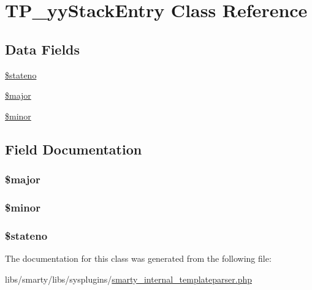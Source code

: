 \hypertarget{class_t_p__yy_stack_entry}{}\section{T\+P\+\_\+yy\+Stack\+Entry Class Reference}
\label{class_t_p__yy_stack_entry}
\subsection*{Data Fields}
\begin{DoxyCompactItemize}
\item 
\hyperlink{class_t_p__yy_stack_entry_aebe2d8de0440725d5783d4447a8548d4}{\$stateno}
\item 
\hyperlink{class_t_p__yy_stack_entry_af144df62b50cc25e0fdcc5bb80e30360}{\$major}
\item 
\hyperlink{class_t_p__yy_stack_entry_ada7edccfef7601184431347519c2ff53}{\$minor}
\end{DoxyCompactItemize}


\subsection{Field Documentation}
\hypertarget{class_t_p__yy_stack_entry_af144df62b50cc25e0fdcc5bb80e30360}{}
\subsubsection[{\$major}]{\setlength{\rightskip}{0pt plus 5cm}\$major}\label{class_t_p__yy_stack_entry_af144df62b50cc25e0fdcc5bb80e30360}
\hypertarget{class_t_p__yy_stack_entry_ada7edccfef7601184431347519c2ff53}{}
\subsubsection[{\$minor}]{\setlength{\rightskip}{0pt plus 5cm}\$minor}\label{class_t_p__yy_stack_entry_ada7edccfef7601184431347519c2ff53}
\hypertarget{class_t_p__yy_stack_entry_aebe2d8de0440725d5783d4447a8548d4}{}
\subsubsection[{\$stateno}]{\setlength{\rightskip}{0pt plus 5cm}\$stateno}\label{class_t_p__yy_stack_entry_aebe2d8de0440725d5783d4447a8548d4}


The documentation for this class was generated from the following file\+:\begin{DoxyCompactItemize}
\item 
libs/smarty/libs/sysplugins/\hyperlink{smarty__internal__templateparser_8php}{smarty\+\_\+internal\+\_\+templateparser.\+php}\end{DoxyCompactItemize}
